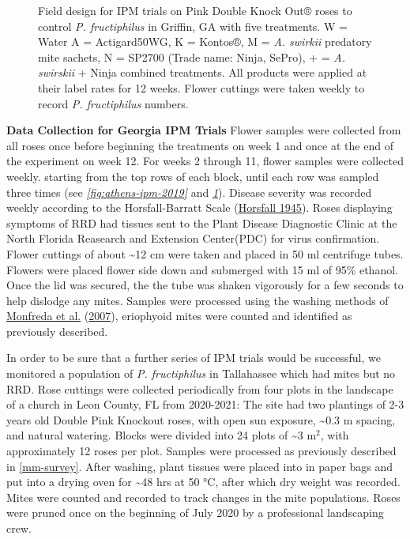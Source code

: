 \documentclass[12pt,final,CPage]{ufthesis}
\renewcommand{\hypertarget}[2]{\leavevmode\oldhypertarget{#1}{#2}}
\begin{document}
{\begin{figure}
{  }

  \caption[Field design for IPM trials on Pink Double Knock Out® roses to control \textit{P. fructiphilus} in Griffin, GA with five treatments]{Field design for IPM trials on Pink Double Knock Out® roses to control \textit{P. fructiphilus} in Griffin, GA with five treatments. W = Water A = Actigard50WG, K = Kontos®, M = \textit{A. swirkii} predatory mite sachets, N = SP2700 (Trade name: Ninja, SePro), + = \textit{A. swirskii} + Ninja combined treatments. All products were applied at their label rates for 12 weeks. Flower cuttings were taken weekly to record \textit{P. fructiphilus} numbers.}\label{fig:griff-ipm-2019}
  \end{figure}
  \textbf{Data Collection for Georgia IPM Trials}
  Flower samples were collected from all roses once before beginning the treatments on week 1 and once at the end of the experiment on week 12. For weeks 2 through 11, flower samples were collected weekly. starting from the top rows of each block, until each row was sampled three times (see \emph{\ref{fig:athens-ipm-2019}} and \emph{\ref{fig:griff-ipm-2019}}). Disease severity was recorded weekly according to the Horsfall-Barratt Scale (\protect\hyperlink{ref-Horsfall1945}{Horsfall 1945}). Roses displaying symptoms of RRD had tissues sent to the Plant Disease Diagnostic Clinic at the North Florida Reasearch and Extension Center(PDC) for virus confirmation. Flower cuttings of about \textasciitilde12 cm were taken and placed in 50 ml centrifuge tubes. Flowers were placed flower side down and submerged with 15 ml of 95\% ethanol. Once the lid was secured, the the tube was shaken vigorously for a few seconds to help dislodge any mites. Samples were processed using the washing methods of \protect\hyperlink{ref-Monfreda2007}{Monfreda et al.} (\protect\hyperlink{ref-Monfreda2007}{2007}), eriophyoid mites were counted and identified as previously described.

  \hypertarget{mm-pheno}{%
  \subsection{Phenology field study}\label{mm-pheno}}

  In order to be sure that a further series of IPM trials would be successful, we monitored a population of \emph{P. fructiphilus} in Tallahassee which had mites but no RRD. Rose cuttings were collected periodically from four plots in the landscape of a church in Leon County, FL from 2020-2021: The site had two plantings of 2-3 years old Double Pink Knockout roses, with open sun exposure, \textasciitilde0.3 \si{\metre} spacing, and natural watering. Blocks were divided into 24 plots of \textasciitilde3 \si{\metre}\(^2\), with approximately 12 roses per plot. Samples were processed as previously described in \ref{mm-survey}. After washing, plant tissues were placed into in paper bags and put into a drying oven for \textasciitilde48 hrs at 50 °C, after which dry weight was recorded. Mites were counted and recorded to track changes in the mite populations. Roses were pruned once on the beginning of July 2020 by a professional landscaping crew.

}
\end{document}
